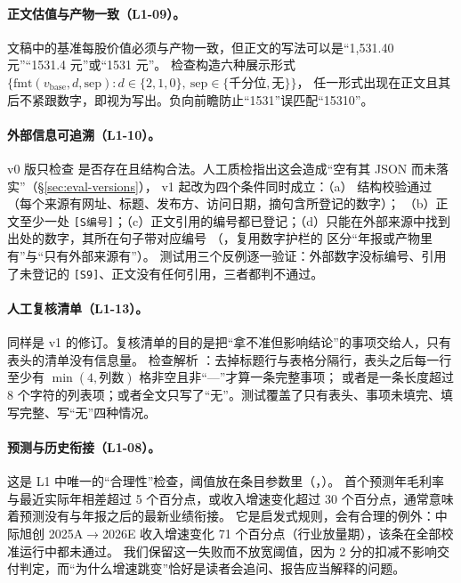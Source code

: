 \paragraph{正文估值与产物一致（L1-09）。}
文稿中的基准每股价值必须与产物一致，但正文的写法可以是“1,531.40 元”“1531.4 元”或“1531 元”。
检查构造六种展示形式 $\{\mathrm{fmt}(v_{\text{base}}, d, \text{sep}) : d\in\{2,1,0\},\ \text{sep}\in\{\text{千分位},\text{无}\}\}$，
任一形式出现在正文且其后不紧跟数字，即视为写出。负向前瞻防止“1531”误匹配“15310”。

\paragraph{外部信息可追溯（L1-10）。}
v0 版只检查  是否存在且结构合法。人工质检指出这会造成“空有其 JSON 而未落实”（\S\ref{sec:eval-versions}），
v1 起改为四个条件同时成立：（a） 结构校验通过（每个来源有网址、标题、发布方、访问日期，摘句含所登记的数字）；
（b）正文至少一处 \texttt{[S编号]}；（c）正文引用的编号都已登记；（d）只能在外部来源中找到出处的数字，其所在句子带对应编号
（，复用数字护栏的  区分“年报或产物里有”与“只有外部来源有”）。
测试用三个反例逐一验证：外部数字没标编号、引用了未登记的 \texttt{[S9]}、正文没有任何引用，三者都判不通过。

\paragraph{人工复核清单（L1-13）。}
同样是 v1 的修订。复核清单的目的是把“拿不准但影响结论”的事项交给人，只有表头的清单没有信息量。
检查解析 ：去掉标题行与表格分隔行，表头之后每一行至少有 $\min(4,\text{列数})$ 格非空且非“—”才算一条完整事项；
或者是一条长度超过 8 个字符的列表项；或者全文只写了“无”。测试覆盖了只有表头、事项未填完、填写完整、写“无”四种情况。

\paragraph{预测与历史衔接（L1-08）。}
这是 L1 中唯一的“合理性”检查，阈值放在条目参数里（，）。
首个预测年毛利率与最近实际年相差超过 5 个百分点，或收入增速变化超过 30 个百分点，通常意味着预测没有与年报之后的最新业绩衔接。
它是启发式规则，会有合理的例外：中际旭创 2025A$\to$2026E 收入增速变化 71 个百分点（行业放量期），该条在全部校准运行中都未通过。
我们保留这一失败而不放宽阈值，因为 2 分的扣减不影响交付判定，而“为什么增速跳变”恰好是读者会追问、报告应当解释的问题。

